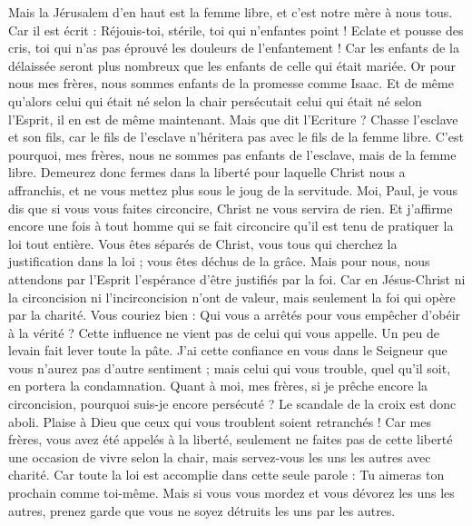 \begin{multicols}{2}
Mais la Jérusalem d'en haut est la femme libre, et c'est notre mère à nous tous.
Car il est écrit : Réjouis-toi, stérile, toi qui n’enfantes point ! Eclate et pousse des cris, toi qui n’as pas éprouvé les douleurs de l’enfantement ! Car les enfants de la délaissée seront plus nombreux que les enfants de celle qui était mariée.
Or pour nous mes frères, nous sommes enfants de la promesse comme Isaac.
Et de même qu’alors celui qui était né selon la chair persécutait celui qui était né selon l'Esprit, il en est de même maintenant.
Mais que dit l'Ecriture ? Chasse l’esclave et son fils, car le fils de l’esclave n’héritera pas avec le fils de la femme libre.
C’est pourquoi, mes frères, nous ne sommes pas enfants de l’esclave, mais de la femme libre.
\VerseOne{}Demeurez donc fermes dans la liberté pour laquelle Christ nous a affranchis, et ne vous mettez plus sous le joug de la servitude.
Moi, Paul, je vous dis que si vous vous faites circoncire, Christ ne vous servira de rien.
Et j’affirme encore une fois à tout homme qui se fait circoncire qu’il est tenu de pratiquer la loi tout entière.
Vous êtes séparés de Christ, vous tous qui cherchez la justification dans la loi ; vous êtes déchus de la grâce.
Mais pour nous, nous attendons par l'Esprit l’espérance d'être justifiés par la foi.
Car en Jésus-Christ ni la circoncision ni l’incirconcision n'ont de valeur, mais seulement la foi qui opère par la charité.
Vous couriez bien : Qui vous a arrêtés pour vous empêcher d'obéir à la vérité ?
Cette influence ne vient pas de celui qui vous appelle.
Un peu de levain fait lever toute la pâte.
J’ai cette confiance en vous dans le Seigneur que vous n'aurez pas d'autre sentiment ; mais celui qui vous trouble, quel qu'il soit, en portera la condamnation.
Quant à moi, mes frères, si je prêche encore la circoncision, pourquoi suis-je encore persécuté ? Le scandale de la croix est donc aboli.
Plaise à Dieu que ceux qui vous troublent soient retranchés !
Car mes frères, vous avez été appelés à la liberté, seulement ne faites pas de cette liberté une occasion de vivre selon la chair, mais servez-vous les uns les autres avec charité.
Car toute la loi est accomplie dans cette seule parole : Tu aimeras ton prochain comme toi-même.
Mais si vous vous mordez et vous dévorez les uns les autres, prenez garde que vous ne soyez détruits les uns par les autres.

\end{multicols}
